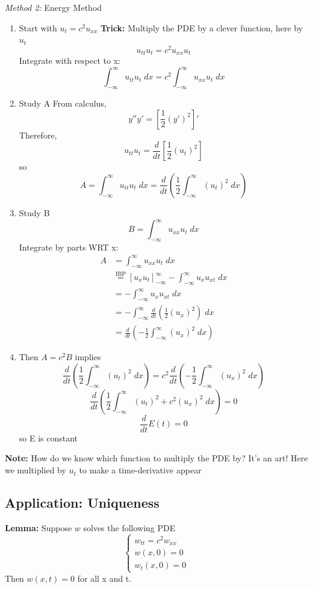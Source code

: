 \documentclass[12pt]{article}
\begin{document}
\emph{Method 2:} Energy Method
\begin{enumerate}
    \item Start with $u_t = c^2 u_{xx}$
    \textbf{Trick:} Multiply the PDE by a clever function, here by $u_t$
    \[u_{tt}u_t = c^2 u_{xx}u_t\]
    Integrate with respect to x:
    \[\int_{-\infty}^\infty u_{tt}u_t \; dx = c^2 \int_{-\infty}^\infty u_{xx}u_t \; dx\]

    \item Study A 
    From calculus,
    \[y'' y' = \left[\frac{1}{2}(y')^2\right]'\]
    Therefore, 
    \[u_{tt}u_t = \frac{d}{dt}\left[\frac{1}{2}(u_t)^2\right]\]
    so 
    \[A = \int_{-\infty}^\infty u_{tt} u_t \; dx = \frac{d}{dt} \left(\frac{1}{2}\int_{-\infty}^{\infty} (u_t)^2 \; dx\right)\]


    \item Study B 
    \[B = \int_{-\infty}^{\infty} u_{xx}u_t \; dx\]
    Integrate by parts WRT x:
    \begin{align*}
        A &= \int_{-\infty}^{\infty} u_{xx} u_t \; dx\\
        &\overset{\text{IBP}}{=} [u_xu_t]_{-\infty}^\infty - \int_{-\infty}^{\infty} u_x u_{xt} \; dx\\
        &= - \int_{-\infty}^{\infty} u_x u_{xt}\; dx\\
        &= - \int_{-\infty}^{\infty} \frac{d}{dt} \left(\frac{1}{2}(u_x)^2\right)\; dx\\
        &= \frac{d}{dt}\left(-\frac{1}{2}\int_{-\infty}^{\infty} (u_x)^2 \; dx\right)
    \end{align*}

    \item Then $A = c^2 B$ implies 
    \[\frac{d}{dt}\left(\frac{1}{2}\int_{-\infty}^{\infty} (u_t)^2 \; dx\right) = c^2 \frac{d}{dt}\left(-\frac{1}{2}\int_{-\infty}^{\infty} (u_x)^2 \; dx\right)\]
    \[\frac{d}{dt}\left(\frac{1}{2}\int_{-\infty}^{\infty} (u_t)^2 + c^2 (u_x)^2\; dx\right) = 0\]
    \[\frac{d}{dt}E(t) = 0\]
    so E is constant
\end{enumerate}

\textbf{Note:} How do we know which function to multiply the PDE by? It's an art! Here we multiplied by $u_t$ to make a time-derivative appear

\subsection*{Application: Uniqueness}
\textbf{Lemma:}
Suppose $w$ solves the following PDE
\[\begin{cases}
    w_{tt} = c^2 w_{xx}\\
    w(x, 0) = 0\\
    w_t(x, 0)= 0
\end{cases}\] 
Then $w(x, t) = 0$ for all x and t.
\end{document}
